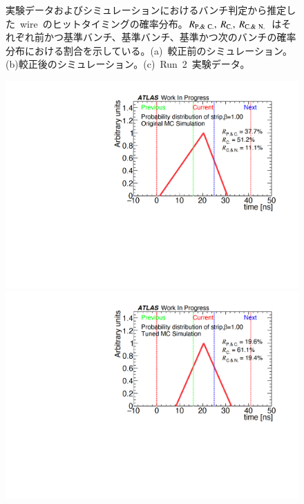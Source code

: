 \begin{figure}[H]
\begin{minipage}{0.33\hsize}
    \subcaption{}
    \end{minipage}
    \caption[実験データおよびシミュレーションにおけるバンチ判定から推定した~wire~のヒットタイミングの確率分布]{実験データおよびシミュレーションにおけるバンチ判定から推定した~wire~のヒットタイミングの確率分布。$R_{\rm{P.\&~C.}},~R_{\rm{C.}},~R_{\rm{C.\&~N.}}$~はそれぞれ前かつ基準バンチ、基準バンチ、基準かつ次のバンチの確率分布における割合を示している。(a)~較正前のシミュレーション。(b)較正後のシミュレーション。(c)~Run~2~実験データ。}\label{fig:recall}
\end{figure}

\begin{figure}[H]
    \begin{minipage}{0.33\hsize}
    \centering   
    \includegraphics[width=\textwidth,page=1]{img/rec/rec_ori_s.pdf}
    \subcaption{}
    \end{minipage}
    \begin{minipage}{0.33\hsize}
    \centering   
    \includegraphics[width=\textwidth,page=1]{img/rec/rec_tune_s.pdf}

\end{minipage}
\end{figure}
